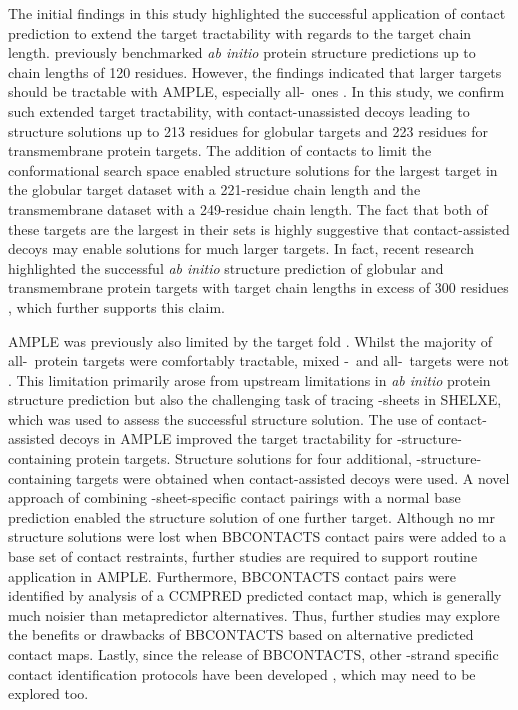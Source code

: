 The initial findings in this study highlighted the successful application of contact prediction to extend the target tractability with regards to the target chain length. \textcite{Bibby2012-lm} previously benchmarked \textit{ab initio} protein structure predictions up to chain lengths of 120 residues. However, the findings indicated that larger targets should be tractable with AMPLE, especially all-\textalpha\ ones \cite{Bibby2012-lm}. In this study, we confirm such extended target tractability, with contact-unassisted decoys leading to structure solutions up to 213 residues for globular targets and 223 residues for transmembrane protein targets. The addition of contacts to limit the conformational search space enabled structure solutions for the largest target in the globular target dataset with a 221-residue chain length and the transmembrane dataset with a 249-residue chain length. The fact that both of these targets are the largest in their sets is highly suggestive that contact-assisted decoys may enable solutions for much larger targets. In fact, recent research highlighted the successful \textit{ab initio} structure prediction of globular and transmembrane protein targets with target chain lengths in excess of 300 residues \cite{Ovchinnikov2017-nd}, which further supports this claim.

AMPLE was previously also limited by the target fold \cite{Bibby2012-lm}. Whilst the majority of all-\textalpha\ protein targets were comfortably tractable, mixed \textalpha-\textbeta\ and all-\textbeta\ targets were not \cite{Bibby2012-lm}. This limitation primarily arose from upstream limitations in \textit{ab initio} protein structure prediction but also the challenging task of tracing \textbeta-sheets in SHELXE, which was used to assess the successful structure solution. The use of contact-assisted decoys in AMPLE improved the target tractability for \textbeta-structure-containing protein targets. Structure solutions for four additional, \textbeta-structure-containing targets were obtained when contact-assisted decoys were used. A novel approach of combining \textbeta-sheet-specific contact pairings with a normal base prediction enabled the structure solution of one further target. Although no \gls{mr} structure solutions were lost when BBCONTACTS contact pairs were added to a base set of contact restraints, further studies are required to support routine application in AMPLE. Furthermore, BBCONTACTS contact pairs were identified by analysis of a CCMPRED predicted contact map, which is generally much noisier than metapredictor alternatives. Thus, further studies may explore the benefits or drawbacks of BBCONTACTS based on alternative predicted contact maps. Lastly, since the release of BBCONTACTS, other \textbeta-strand specific contact identification protocols have been developed \cite{Mao2018-mo}, which may need to be explored too.

